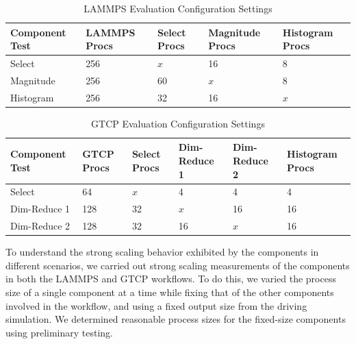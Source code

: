  

\begin{table}[tbp]
\centering
\caption{LAMMPS Evaluation Configuration Settings}
\label{tab:eval-strong-lammps}
\vspace{-0.15in}
\begin{tabular}{|l|l|l|l|l|}
\hline
Component Test & LAMMPS Procs & Select Procs & Magnitude Procs & Histogram Procs \\
\hline
Select & 256 & $x$ & 16 & 8\\
\hline
Magnitude & 256 & 60 & $x$ & 8\\
\hline
Histogram & 256 & 32 & 16 & $x$\\
\hline
\end{tabular}
\end{table}


\begin{table}[tbp]
\centering
\caption{GTCP Evaluation Configuration Settings}
\label{tab:eval-strong-gtcp}
\vspace{-0.15in}
\begin{tabular}{|l|l|l|l|l|l|}
\hline
Component Test & GTCP Procs & Select Procs & Dim-Reduce 1 & Dim-Reduce 2 & Histogram Procs \\
\hline
Select & 64 & $x$ & 4 & 4 & 4\\
\hline
Dim-Reduce 1 & 128 & 32 & $x$ & 16 & 16\\
\hline
Dim-Reduce 2 & 128 & 32 & 16 & $x$ & 16\\
\hline
\end{tabular}
\vspace{-0.07in}
\end{table}


To understand the strong scaling behavior exhibited by the components in
different scenarios, we carried out strong scaling measurements of the
components in both the LAMMPS and GTCP workflows.
To do this, we varied the process size of a single component at
a time while fixing that of the other components involved in the workflow,
and using a fixed output size from the driving simulation.  We
determined reasonable process sizes for the fixed-size components using
preliminary testing. 


